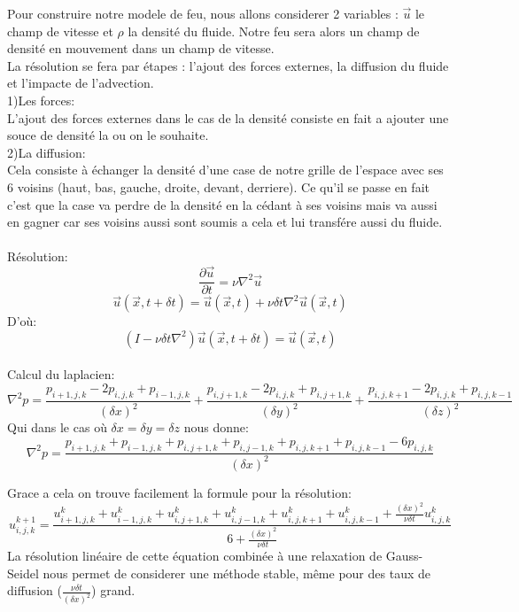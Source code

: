 \documentclass[a4paper,10pt]{article}
\begin{document}
Pour construire notre modele de feu, nous allons considerer 2 variables : $\vec{u}$ le champ de vitesse et $\rho$ la densité du fluide. Notre feu sera alors un champ de densité en mouvement dans un champ de vitesse.\\
	La résolution se fera par étapes : l'ajout des forces externes, la diffusion du fluide et l'impacte de l'advection.
\\

	1)Les forces:\\
L'ajout des forces externes dans le cas de la densité consiste en fait a ajouter une souce de densité la ou on le souhaite.\\

	2)La diffusion:\\
Cela consiste à échanger la densité d'une case de notre grille de l'espace avec ses 6 voisins (haut, bas, gauche, droite, devant, derriere). Ce qu'il se passe en fait c'est que la case va perdre de la densité en la cédant à ses voisins mais va aussi en gagner car ses voisins aussi sont soumis a cela et lui transfére aussi du fluide.\\
\\
Résolution:
\begin{equation}
   \frac{\partial \vec{u}}{\partial t} =  \nu{\nabla^2}\vec{u} 
\end{equation}
\begin{equation}
	\vec{u}(\vec{x},t+\delta t) = \vec{u}(\vec{x},t) +\nu \delta t {\nabla^2} \vec{u}(\vec{x},t) 
\end{equation}
D'où:
\begin{equation}
  (I - \nu \delta t {\nabla^2})\vec{u}(\vec{x},t+\delta t) = \vec{u}(\vec{x},t) 
\end{equation}
	\\

Calcul du laplacien:
\begin{equation}
   {\nabla^2}p = \frac{p_{i+1,j,k} - 2p_{i,j,k} + p_{i-1,j,k} }{({\delta x})^2} + \frac{p_{i,j+1,k} - 2p_{i,j,k} + p_{i,j+1,k}}{({\delta y})^2} + \frac{p_{i,j,k+1} - 2p_{i,j,k} + p_{i,j,k-1}}{({\delta z})^2} 
\end{equation}
Qui dans le cas où $\delta x = \delta y =\delta z$ nous donne:
\begin{equation}
   {\nabla^2}p = \frac{p_{i+1,j,k} + p_{i-1,j,k} + p_{i,j+1,k} + p_{i,j-1,k} + p_{i,j,k+1} + p_{i,j,k-1} - 6p_{i,j,k} }{({\delta x})^2} 
\end{equation}

Grace a cela on trouve facilement la formule pour la résolution:
\begin{equation}
   u_{i,j,k}^{k+1} = \frac{u_{i+1,j,k}^{k} + 
						   u_{i-1,j,k}^{k} + 
						   u_{i,j+1,k}^{k} +
						   u_{i,j-1,k}^{k} + 
					       u_{i,j,k+1}^{k} + 
						   u_{i,j,k-1}^{k} + 
						   \frac{({\delta x})^2}{\nu \delta t} u_{i,j,k}^{k}}{ 6 + \frac{({\delta x})^2}{\nu \delta t}} 
\end{equation}
La résolution linéaire de cette équation combinée à une relaxation de Gauss-Seidel nous permet de considerer une méthode stable, même pour des taux de diffusion ($ \frac{\nu \delta t}{({\delta x})^2}$) grand.\\
\end{document}
